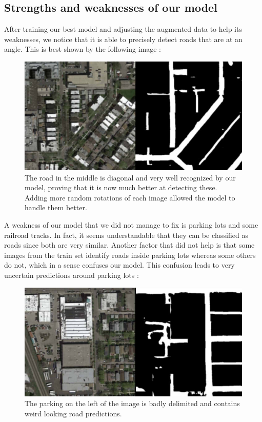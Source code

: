 \documentclass[10pt,conference,compsocconf]{IEEEtran}
\begin{document}
\subsection{Strengths and weaknesses of our model}
After training our best model and adjusting the augmented data to help its weaknesses, we notice that it is able to precisely detect roads that are at an angle. This is best shown by the following image :
\begin{figure}[H]
    \centering
    \includegraphics[scale = 0.25]{report_images/diagonal.jpg} %
    \caption{The road in the middle is diagonal and very well recognized by our model, proving that it is now much better at detecting these. Adding more random rotations of each image allowed the model to handle them better.}
\end{figure}
A weakness of our model that we did not manage to fix is parking lots and some railroad tracks. In fact, it seems understandable that they can be classified as roads since both are very similar. Another factor that did not help is that some images from the train set identify roads inside parking lots whereas some others do not, which in a sense confuses our model. This confusion leads to very uncertain predictions around parking lots : 
\begin{figure}[H]
    \centering
    \includegraphics[scale = 0.25]{report_images/parking.jpg} %
    \caption{The parking on the left of the image is badly delimited and contains weird looking road predictions.}
\end{figure}
\end{document}
